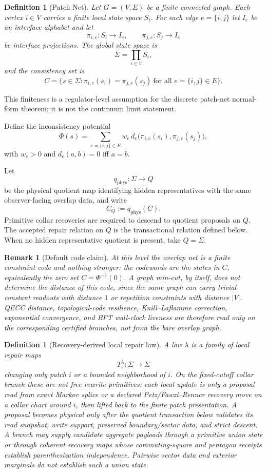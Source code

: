 \documentclass[11pt]{article}
\newtheorem{definition}[theorem]{Definition}
\newtheorem{remark}[theorem]{Remark}
\begin{document}
\begin{definition}[Patch Net]\label{def:patchnet}
Let $G=(V,E)$ be a finite connected graph. Each vertex $i\in V$ carries a finite local state space $S_i$. For each edge $e=\{i,j\}$ let $I_e$ be an interface alphabet and let
\[
\pi_{i,e}:S_i\to I_e,
\qquad
\pi_{j,e}:S_j\to I_e
\]
be interface projections. The global state space is
\[
\Sigma=\prod_{i\in V} S_i,
\]
and the consistency set is
\[
C=\bigl\{s\in\Sigma:\pi_{i,e}(s_i)=\pi_{j,e}(s_j)\ \text{for all }e=\{i,j\}\in E\bigr\}.
\]
\end{definition}

This finiteness is a regulator-level assumption for the discrete patch-net normal-form theorem; it is not the continuum limit statement.

Define the inconsistency potential
\[
\Phi(s)=\sum_{e=\{i,j\}\in E}w_e\, d_e\!\bigl(\pi_{i,e}(s_i),\pi_{j,e}(s_j)\bigr),
\]
with $w_e>0$ and $d_e(a,b)=0$ iff $a=b$.

Let
\[
q_{\mathrm{phys}}:\Sigma\to Q
\]
be the physical quotient map identifying hidden representatives with the same observer-facing
overlap data, and write
\[
C_Q:=q_{\mathrm{phys}}(C).
\]
Primitive collar recoveries are required to descend to quotient proposals on \(Q\). The accepted
repair relation on \(Q\) is the transactional relation defined below. When no hidden
representative quotient is present, take \(Q=\Sigma\).

\begin{remark}[Default code claim]\label{rem:constraint-code-firewall}
At this level the overlap net is a finite constraint code and nothing stronger: the codewords are
the states in \(C\), equivalently the zero set \(C=\Phi^{-1}(0)\). A graph min-cut, by itself,
does not determine the distance of this code, since the same graph can carry trivial constant
readouts with distance \(1\) or repetition constraints with distance \(|V|\). QECC distance,
topological-code resilience, Knill--Laflamme correction, exponential convergence, and BFT
wall-clock liveness are therefore read only on the corresponding certified branches, not from the
bare overlap graph.
\end{remark}

\begin{definition}[Recovery-derived local repair law]
A law $\lambda$ is a family of local repair maps
\[
T_i^\lambda:\Sigma\to\Sigma
\]
changing only patch $i$ or a bounded neighborhood of $i$. On the fixed-cutoff collar branch these
are not free rewrite primitives: each local update is only a proposal read from exact Markov splice
or a declared Petz/Fawzi--Renner recovery move on a collar chart around \(i\), then lifted back to
the finite patch presentation. A proposal becomes physical only after the quotient transaction
below validates its read snapshot, write support, preserved boundary/sector data, and strict
descent. A branch may supply candidate aggregate payloads through a primitive union state or
through coherent recovery maps whose commuting-square and pentagon receipts establish
parenthesization independence. Pairwise sector data and exterior marginals do not establish such
a union state.
\end{definition}
\end{document}
